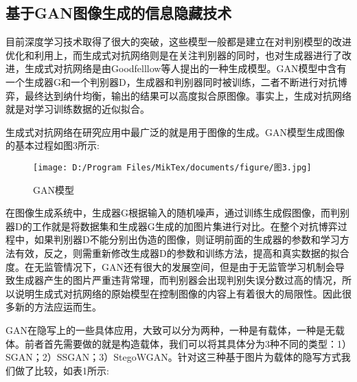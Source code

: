     \subsection{基于GAN图像生成的信息隐藏技术}
    目前深度学习技术取得了很大的突破，这些模型一般都是建立在对判别模型的改进优化和利用上\cite{ref4}，而生成式对抗网络则是在关注判别器的同时，也对生成器进行了改进，生成式对抗网络\cite{ref5}是由Goodfelllow等人提出的一种生成模型。GAN模型\cite{ref6}中含有一个生成器G和一个判别器D，生成器和判别器同时被训练，二者不断进行对抗博弈，最终达到纳什均衡，输出的结果可以高度拟合原图像。事实上，生成对抗网络就是对学习训练数据的近似拟合。
    \par 生成式对抗网络在研究应用中最广泛的就是用于图像的生成\cite{ref7}。GAN模型生成图像的基本过程如图3所示:
    \begin{figure}[!ht]\centering   %
    \texttt{[image: D:/Program Files/MikTex/documents/figure/图3.jpg]}%
    \caption{GAN模型}
    \end{figure}
    \par\noindent 在图像生成系统中，生成器G根据输入的随机噪声，通过训练生成假图像，而判别器D的工作就是将数据集和生成器G生成的加图片集进行对比。在整个对抗博弈过程中，如果判别器D不能分别出伪造的图像，则证明前面的生成器的参数和学习方法有效，反之，则需重新修改生成器D的参数和训练方法，提高和真实数据的拟合度。在无监管情况下，GAN还有很大的发展空间，但是由于无监管学习机制会导致生成器产生的图片严重违背常理，而判别器会出现判别失误分数过高的情况，所以说明生成式对抗网络的原始模型在控制图像的内容上有着很大的局限性。因此很多新的方法应运而生。
    \par GAN在隐写上的一些具体应用\cite{ref8}，大致可以分为两种，一种是有载体，一种是无载体。前者首先需要做的就是构造载体，我们可以将其具体分为3种不同的类型：1）SGAN；2）SSGAN；3）StegoWGAN。针对这三种基于图片为载体的隐写方式我们做了比较，如表1所示:
